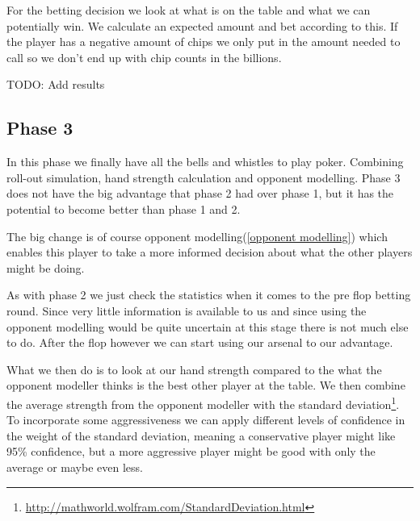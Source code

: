 \documentclass[titlepage, a4paper]{article}
\begin{document}
For the betting decision we look at what is on the table and what we can potentially
win. We calculate an expected amount and bet according to this. If the player has a negative
amount of chips we only put in the amount needed to call so we don't end up with chip counts in the
billions.

TODO: Add results

\subsection{Phase 3}\label{phase 3 player}
In this phase we finally have all the bells and whistles to play poker. Combining
roll-out simulation, hand strength calculation and opponent modelling. Phase 3 does
not have the big advantage that phase 2 had over phase 1, but it has the potential
to become better than phase 1 and 2.

The big change is of course opponent modelling(\ref{opponent modelling}) which enables
this player to take a more informed decision about what the other players might be
doing.

As with phase 2 we just check the statistics when it comes to the pre flop betting round.
Since very little information is available to us and since using the opponent modelling
would be quite uncertain at this stage there is not much else to do. After the
flop however we can start using our arsenal to our advantage.

What we then do is
to look at our hand strength compared to the what the opponent modeller thinks is
the best other player at the table. We then combine the average strength from the
opponent modeller with the standard deviation\footnote{\url{http://mathworld.wolfram.com/StandardDeviation.html}}. To incorporate some aggressiveness we can apply different levels of confidence
in the weight of the standard deviation, meaning a conservative player might like
95\% confidence, but a more aggressive player might be good with only the average
or maybe even less.
\end{document}

